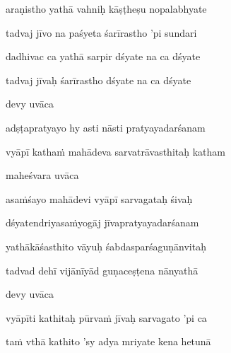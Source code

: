 araṇistho yathā vahniḥ kāṣṭheṣu nopalabhyate\thinspace{\dandab} \dontdisplaylinenum

tadvaj jīvo na paśyeta śarīrastho 'pi sundari \veg\dontdisplaylinenum
{}

dadhivac ca yathā sarpir dśyate na ca dśyate\thinspace{\dandab} \dontdisplaylinenum

tadvaj jīvaḥ śarīrastho dśyate na ca dśyate \veg\dontdisplaylinenum
{}

devy uvāca~{\dandab}\dontdisplaylinenum 

adṣṭapratyayo hy asti nāsti pratyayadarśanam\thinspace{\danda} \dontdisplaylinenum

vyāpī kathaṁ mahādeva sarvatrāvasthitaḥ katham \veg\dontdisplaylinenum
{}

maheśvara uvāca~{\dandab}\dontdisplaylinenum 
{}

asaṁśayo mahādevi vyāpī sarvagataḥ śivaḥ\thinspace{\danda} \dontdisplaylinenum

dśyatendriyasaṁyogāj jīvapratyayadarśanam \veg\dontdisplaylinenum
{}

yathākāśasthito vāyuḥ śabdasparśaguṇānvitaḥ\thinspace{\dandab} \dontdisplaylinenum

tadvad dehī vijānīyād guṇaceṣṭena nānyathā \veg\dontdisplaylinenum
{}

devy uvāca~{\dandab}\dontdisplaylinenum 

vyāpīti kathitaḥ pūrvaṁ jīvaḥ sarvagato 'pi ca\thinspace{\danda} \dontdisplaylinenum

taṁ vthā kathito 'sy adya mriyate kena hetunā \veg\dontdisplaylinenum
{}


